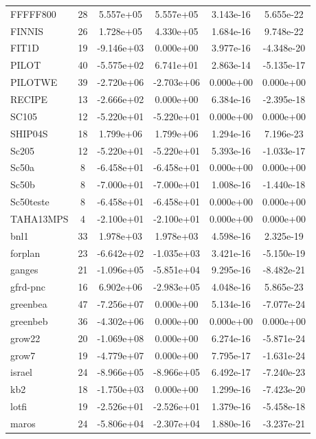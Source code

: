 \documentclass[12pt]{article}
\begin{document}
\begin{longtable}{@{}l|ccccc@{}}
FFFFF800 & 28 & 5.557e+05 & 5.557e+05 & 3.143e-16 & 5.655e-22 \\
FINNIS & 26 & 1.728e+05 & 4.330e+05 & 1.684e-16 & 9.748e-22 \\
FIT1D & 19 & -9.146e+03 & 0.000e+00 & 3.977e-16 & -4.348e-20 \\
PILOT & 40 & -5.575e+02 & 6.741e+01 & 2.863e-14 & -5.135e-17 \\
PILOTWE & 39 & -2.720e+06 & -2.703e+06 & 0.000e+00 & 0.000e+00 \\
RECIPE & 13 & -2.666e+02 & 0.000e+00 & 6.384e-16 & -2.395e-18 \\
SC105 & 12 & -5.220e+01 & -5.220e+01 & 0.000e+00 & 0.000e+00 \\
SHIP04S & 18 & 1.799e+06 & 1.799e+06 & 1.294e-16 & 7.196e-23 \\
Sc205 & 12 & -5.220e+01 & -5.220e+01 & 5.393e-16 & -1.033e-17 \\
Sc50a & 8 & -6.458e+01 & -6.458e+01 & 0.000e+00 & 0.000e+00 \\
Sc50b & 8 & -7.000e+01 & -7.000e+01 & 1.008e-16 & -1.440e-18 \\
Sc50teste & 8 & -6.458e+01 & -6.458e+01 & 0.000e+00 & 0.000e+00 \\
TAHA13MPS & 4 & -2.100e+01 & -2.100e+01 & 0.000e+00 & 0.000e+00 \\
bnl1 & 33 & 1.978e+03 & 1.978e+03 & 4.598e-16 & 2.325e-19 \\
forplan & 23 & -6.642e+02 & -1.035e+03 & 3.421e-16 & -5.150e-19 \\
ganges & 21 & -1.096e+05 & -5.851e+04 & 9.295e-16 & -8.482e-21 \\
gfrd-pnc & 16 & 6.902e+06 & -2.983e+05 & 4.048e-16 & 5.865e-23 \\
greenbea & 47 & -7.256e+07 & 0.000e+00 & 5.134e-16 & -7.077e-24 \\
greenbeb & 36 & -4.302e+06 & 0.000e+00 & 0.000e+00 & 0.000e+00 \\
grow22 & 20 & -1.069e+08 & 0.000e+00 & 6.274e-16 & -5.871e-24 \\
grow7 & 19 & -4.779e+07 & 0.000e+00 & 7.795e-17 & -1.631e-24 \\
israel & 24 & -8.966e+05 & -8.966e+05 & 6.492e-17 & -7.240e-23 \\
kb2 & 18 & -1.750e+03 & 0.000e+00 & 1.299e-16 & -7.423e-20 \\
lotfi & 19 & -2.526e+01 & -2.526e+01 & 1.379e-16 & -5.458e-18 \\
maros & 24 & -5.806e+04 & -2.307e+04 & 1.880e-16 & -3.237e-21 \\

\end{longtable}
\end{document}
